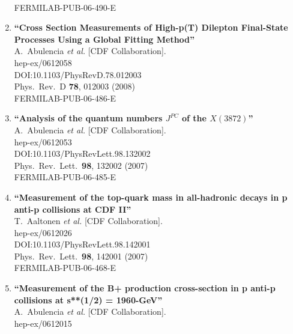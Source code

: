 \documentclass{article}
\begin{document}
\begin{enumerate}
  \\{}FERMILAB-PUB-06-490-E
\item%
{\bf ``Cross Section Measurements of High-p(T) Dilepton Final-State Processes Using a Global Fitting Method''}
  \\{}A.~Abulencia {\it et al.} [CDF Collaboration].
  \\{}hep-ex/0612058
  \\{}DOI:10.1103/PhysRevD.78.012003
  \\{}Phys.\ Rev.\ D {\bf 78}, 012003 (2008)
  \\{}FERMILAB-PUB-06-486-E
\item%
{\bf ``Analysis of the quantum numbers $J^{PC}$ of the $X(3872)$''}
  \\{}A.~Abulencia {\it et al.} [CDF Collaboration].
  \\{}hep-ex/0612053
  \\{}DOI:10.1103/PhysRevLett.98.132002
  \\{}Phys.\ Rev.\ Lett.\  {\bf 98}, 132002 (2007)
  \\{}FERMILAB-PUB-06-485-E
\item%
{\bf ``Measurement of the top-quark mass in all-hadronic decays in p anti-p collisions at CDF II''}
  \\{}T.~Aaltonen {\it et al.} [CDF Collaboration].
  \\{}hep-ex/0612026
  \\{}DOI:10.1103/PhysRevLett.98.142001
  \\{}Phys.\ Rev.\ Lett.\  {\bf 98}, 142001 (2007)
  \\{}FERMILAB-PUB-06-468-E
\item%
{\bf ``Measurement of the B+ production cross-section in p anti-p collisions at s**(1/2) = 1960-GeV''}
  \\{}A.~Abulencia {\it et al.} [CDF Collaboration].
  \\{}hep-ex/0612015

\end{enumerate}
\end{document}
